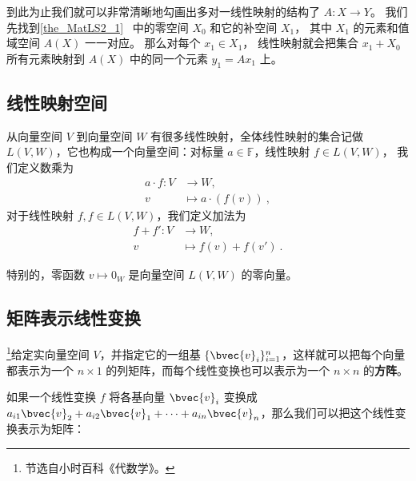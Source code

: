 到此为止我们就可以非常清晰地勾画出多对一线性映射的结构了 $A: X \to Y$。 我们先找到\autoref{the_MatLS2_1}~ 中的零空间 $X_0$ 和它的补空间 $X_1$， 其中 $X_1$ 的元素和值域空间 $A(X)$ 一一对应。 那么对每个 $x_1 \in X_1$， 线性映射就会把集合 $x_1 + X_0$ 所有元素映射到 $A(X)$ 中的同一个元素 $y_1 = Ax_1$ 上。


\subsection{线性映射空间}\label{sub_LinMap_1}


从向量空间 $V$ 到向量空间 $W$ 有很多线性映射，全体线性映射的集合记做 $L(V, W)$，它也构成一个向量空间：对标量 $a \in \mathbb{F}$，线性映射 $f \in L(V, W)$， 我们定义数乘为
\begin{equation}
\begin{aligned}
a \cdot f: V &\to W, \\
v &\mapsto a \cdot (f(v))~,
\end{aligned}
\end{equation}
对于线性映射 $f, f \in L(V, W)$，我们定义加法为
\begin{equation}
\begin{aligned}
f + f': V &\to W, \\
v &\mapsto f(v) + f(v')~.
\end{aligned}
\end{equation}

特别的，零函数 $v \mapsto 0_W$ 是向量空间 $L(V, W)$ 的零向量。


\subsection{矩阵表示线性变换}


\footnote{节选自小时百科《代数学》。}给定实向量空间 $V$，并指定它的一组基 $\{\bvec{v}_i\}_{i=1}^n$，这样就可以把每个向量都表示为一个 $n\times 1$ 的列矩阵，而每个线性变换也可以表示为一个 $n\times n$ 的\textbf{方阵}。

如果一个线性变换 $f$ 将各基向量 $\bvec{v}_i$ 变换成 $a_{i1}\bvec{v}_2+a_{i2}\bvec{v}_1+\cdots+a_{in}\bvec{v}_n$，那么我们可以把这个线性变换表示为矩阵：

